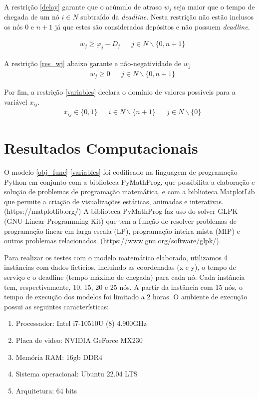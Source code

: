 \documentclass[12pt]{article}
\begin{document}
A restrição \eqref{delay} garante que o acúmulo de atraso $w_j$ seja maior que o tempo de chegada de um nó $i \in N$ subtraído da {\it deadline}. Nesta restrição não estão inclusos os nós $0$ e $n+1$ já que estes são considerados depósitos e não possuem {\it deadline}.

\begin{align}
   & w_j \geq \varphi_j - D_j & \label{delay} & j\in N\backslash \{0,n+1\}
\end{align}

A restrição \eqref{res_wj} abaixo garante e não-negatividade de $w_j$
\begin{align}
   & w_j \geq 0 &  & j\in N\backslash \{0,n+1\} \label{res_wj}
\end{align}

Por fim, a restrição \eqref{variables} declara o domínio de valores possíveis para a variável $x_{ij}$.
\begin{align}
   & x_{ij} \in \{0,1\} &  & i\in N\backslash \{n+1\} &  & j\in N\backslash \{0\}  \label{variables}
\end{align}



\section{Resultados Computacionais}
O modelo \eqref{obj_func}-\eqref{variables} foi codificado na linguagem de programação Python em conjunto com a biblioteca PyMathProg, que possibilita a elaboração e solução de problemas de programação matemática, e com a biblioteca MatplotLib que permite a criação de visualizações estáticas, animadas e interativas.(https://matplotlib.org/)
A biblioteca PyMathProg faz uso do solver GLPK (GNU Linear Programming Kit) que tem a função de resolver problemas de programação linear em larga escala (LP), programação inteira mista (MIP) e outros problemas relacionados. (https://www.gnu.org/software/glpk/).

Para realizar os testes com o modelo matemático elaborado, utilizamos 4 instâncias com dados fictícios, incluindo as coordenadas (x e y), o tempo de serviço e o deadline (tempo máximo de chegada) para cada nó.
Cada instância tem, respectivamente, 10, 15, 20 e 25 nós. A partir da instância com 15 nós, o tempo de execução dos modelos foi limitado a 2 horas.
O ambiente de execução possui as seguintes características:

\begin{enumerate}[-]
  \item Processador: Intel i7-10510U (8) 4.900GHz
  \item Placa de video: NVIDIA GeForce MX230
  \item Memória RAM: 16gb DDR4
  \item Sistema operacional: Ubuntu 22.04 LTS
  \item Arquitetura: 64 bits
\end{enumerate}
\end{document}
